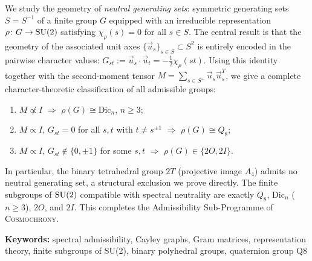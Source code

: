 We study the geometry of \emph{neutral generating sets}: symmetric generating sets
$S = S^{-1}$ of a finite group $G$ equipped with an irreducible representation
$\rho\colon G \to \mathrm{SU}(2)$ satisfying $\chi_\rho(s) = 0$ for all $s \in S$.
The central result is that the geometry of the associated unit axes
$\{\vec{u}_s\}_{s \in S} \subset S^2$ is entirely encoded in the pairwise
character values: $G_{st} := \vec{u}_s \cdot \vec{u}_t = -\tfrac{1}{2}\chi_\rho(st)$.
Using this identity together with the second-moment tensor
$M = \sum_{s \in S^+} \vec{u}_s \vec{u}_s^T$,
we give a complete character-theoretic classification of all admissible groups:
\begin{enumerate}
  \item[(i)] $M \not\propto I$ $\Longrightarrow$ $\rho(G) \cong \mathrm{Dic}_n$, $n \ge 3$;
  \item[(ii)] $M \propto I$, $G_{st} = 0$ for all $s, t$ with $t \neq s^{\pm 1}$
  $\Longrightarrow$ $\rho(G) \cong Q_8$;
  \item[(iii)] $M \propto I$, $G_{st} \notin \{0, \pm 1\}$ for some $s, t$
  $\Longrightarrow$ $\rho(G) \in \{2O, 2I\}$.
\end{enumerate}
In particular, the binary tetrahedral group $2T$ (projective image $A_4$)
admits no neutral generating set, a structural exclusion we prove directly.
The finite subgroups of $\mathrm{SU}(2)$ compatible with spectral neutrality are
exactly $Q_8$, $\mathrm{Dic}_n$ ($n \ge 3$), $2O$, and $2I$.
This completes the Admissibility Sub-Programme of \textsc{Cosmochrony}.

\medskip
\noindent\textbf{Keywords:}
spectral admissibility, Cayley graphs, Gram matrices, representation theory,
finite subgroups of SU(2), binary polyhedral groups, quaternion group Q8

